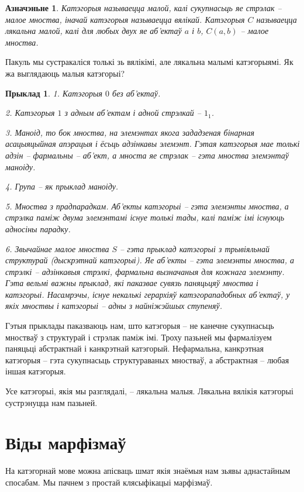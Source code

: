 \documentclass[a4paper,12pt]{book}
\newtheorem{example}{Прыклад}[section]
\newtheorem{definition}{Азначэньне}[section]
\begin{document}
\begin{definition}
  Катэгорыя называецца малой, калі сукупнасьць яе стрэлак -- малое
  мноства, іначай катэгорыя называецца вялікай. Катэгорыя $C$ называецца
  лякальна малой, калі для любых двух яе аб'ектаў $a$ і $b$, $C(a, b)$
  -- малое мноства.
\end{definition}

Пакуль мы сустракаліся толькі зь вялікімі, але лякальна малымі катэгорыямі. Як жа выглядаюць
малыя катэгорыі?

\begin{example}
  1. Катэгорыя $0$ без аб'ектаў.

  2. Катэгорыя $1$ з адным аб'ектам і адной стрэлкай -- $1_1$.

  3. Маноід, то бок мноства, на элемэнтах якога зададзеная бінарная
  асацыяцыйная апэрацыя і ёсьць адзінкавы элемэнт. Гэтая катэгорыя мае
  толькі адзін -- фармальны -- аб'ект, а мноста яе стрэлак -- гэта
  мноства элемэнтаў маноіду.

  4. Група -- як прыклад маноіду.

  5. Мноства з прадпарадкам. Аб'екты катэгорыі -- гэта
  элемэнты мноства, а стрэлка паміж двума элемэнтамі існуе толькі
  тады, калі паміж імі існуюць адносіны парадку.

  6. Звычайнае малое мноства $S$ -- гэта прыклад катэгорыі з трывіяльнай
  структурай (дыскрэтнай катэгорыі). Яе аб'екты -- гэта элемэнты
  мноства, а стрэлкі -- адзінкавыя стрэлкі, фармальна вызначаныя для
  кожнага элемэнту. Гэта вельмі важны прыклад, які паказвае сувязь
  паняцьцяў мноства і катэгорыі. Насамрэчы, існуе некалькі герархіяў
  катэгорападобных аб'ектаў, у якіх мноствы і катэгорыі -- адны з
  найніжэйшых ступеняў.
\end{example}

Гэтыя прыклады паказваюць нам, што катэгорыя -- не канечне сукупнасьць
мностваў з структурай і стрэлак паміж імі. Троху пазьней мы
фармалізуем паняцьці абстрактнай і канкрэтнай катэгорый. Нефармальна,
канкрэтная катэгорыя -- гэта сукупнасьць структураваных мностваў, а
абстрактная -- любая іншая катэгорыя.

Усе катэгорыі, якія мы разглядалі, -- лякальна малыя. Лякальна вялікія
катэгорыі сустрэнуцца нам пазьней.

\section{Віды марфізмаў}

На катэгорнай мове можна апісваць шмат якія знаёмыя нам зьявы
аднастайным спосабам. Мы пачнем з простай клясыфікацыі марфізмаў.
\end{document}
